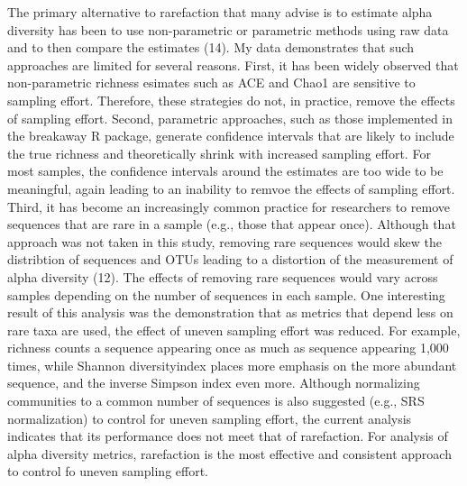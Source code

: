 \documentclass[
]{article}
\begin{document}
The primary alternative to rarefaction that many advise is to estimate
alpha diversity has been to use non-parametric or parametric methods
using raw data and to then compare the estimates (14). My data
demonstrates that such approaches are limited for several reasons.
First, it has been widely observed that non-parametric richness esimates
such as ACE and Chao1 are sensitive to sampling effort. Therefore, these
strategies do not, in practice, remove the effects of sampling effort.
Second, parametric approaches, such as those implemented in the
breakaway R package, generate confidence intervals that are likely to
include the true richness and theoretically shrink with increased
sampling effort. For most samples, the confidence intervals around the
estimates are too wide to be meaningful, again leading to an inability
to remvoe the effects of sampling effort. Third, it has become an
increasingly common practice for researchers to remove sequences that
are rare in a sample (e.g., those that appear once). Although that
approach was not taken in this study, removing rare sequences would skew
the distribtion of sequences and OTUs leading to a distortion of the
measurement of alpha diversity (12). The effects of removing rare
sequences would vary across samples depending on the number of sequences
in each sample. One interesting result of this analysis was the
demonstration that as metrics that depend less on rare taxa are used,
the effect of uneven sampling effort was reduced. For example, richness
counts a sequence appearing once as much as sequence appearing 1,000
times, while Shannon diversityindex places more emphasis on the more
abundant sequence, and the inverse Simpson index even more. Although
normalizing communities to a common number of sequences is also
suggested (e.g., SRS normalization) to control for uneven sampling
effort, the current analysis indicates that its performance does not
meet that of rarefaction. For analysis of alpha diversity metrics,
rarefaction is the most effective and consistent approach to control fo
uneven sampling effort.
\end{document}
